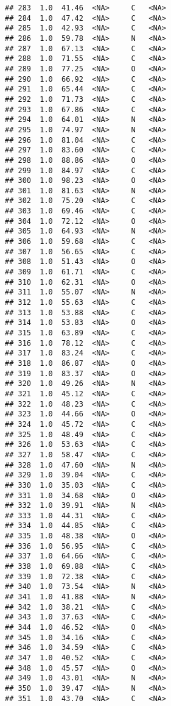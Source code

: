 \documentclass[
]{article}
\begin{document}
\begin{verbatim}
## 283  1.0  41.46  <NA>     C   <NA>
## 284  1.0  47.42  <NA>     C   <NA>
## 285  1.0  42.93  <NA>     C   <NA>
## 286  1.0  59.78  <NA>     N   <NA>
## 287  1.0  67.13  <NA>     C   <NA>
## 288  1.0  71.55  <NA>     C   <NA>
## 289  1.0  77.25  <NA>     O   <NA>
## 290  1.0  66.92  <NA>     C   <NA>
## 291  1.0  65.44  <NA>     C   <NA>
## 292  1.0  71.73  <NA>     C   <NA>
## 293  1.0  67.86  <NA>     C   <NA>
## 294  1.0  64.01  <NA>     N   <NA>
## 295  1.0  74.97  <NA>     N   <NA>
## 296  1.0  81.04  <NA>     C   <NA>
## 297  1.0  83.60  <NA>     C   <NA>
## 298  1.0  88.86  <NA>     O   <NA>
## 299  1.0  84.97  <NA>     C   <NA>
## 300  1.0  98.23  <NA>     O   <NA>
## 301  1.0  81.63  <NA>     N   <NA>
## 302  1.0  75.20  <NA>     C   <NA>
## 303  1.0  69.46  <NA>     C   <NA>
## 304  1.0  72.12  <NA>     O   <NA>
## 305  1.0  64.93  <NA>     N   <NA>
## 306  1.0  59.68  <NA>     C   <NA>
## 307  1.0  56.65  <NA>     C   <NA>
## 308  1.0  51.43  <NA>     O   <NA>
## 309  1.0  61.71  <NA>     C   <NA>
## 310  1.0  62.31  <NA>     O   <NA>
## 311  1.0  55.07  <NA>     N   <NA>
## 312  1.0  55.63  <NA>     C   <NA>
## 313  1.0  53.88  <NA>     C   <NA>
## 314  1.0  53.83  <NA>     O   <NA>
## 315  1.0  63.89  <NA>     C   <NA>
## 316  1.0  78.12  <NA>     C   <NA>
## 317  1.0  83.24  <NA>     C   <NA>
## 318  1.0  86.87  <NA>     O   <NA>
## 319  1.0  83.37  <NA>     O   <NA>
## 320  1.0  49.26  <NA>     N   <NA>
## 321  1.0  45.12  <NA>     C   <NA>
## 322  1.0  48.23  <NA>     C   <NA>
## 323  1.0  44.66  <NA>     O   <NA>
## 324  1.0  45.72  <NA>     C   <NA>
## 325  1.0  48.49  <NA>     C   <NA>
## 326  1.0  53.63  <NA>     C   <NA>
## 327  1.0  58.47  <NA>     C   <NA>
## 328  1.0  47.60  <NA>     N   <NA>
## 329  1.0  39.04  <NA>     C   <NA>
## 330  1.0  35.03  <NA>     C   <NA>
## 331  1.0  34.68  <NA>     O   <NA>
## 332  1.0  39.91  <NA>     N   <NA>
## 333  1.0  44.31  <NA>     C   <NA>
## 334  1.0  44.85  <NA>     C   <NA>
## 335  1.0  48.38  <NA>     O   <NA>
## 336  1.0  56.95  <NA>     C   <NA>
## 337  1.0  64.66  <NA>     C   <NA>
## 338  1.0  69.88  <NA>     C   <NA>
## 339  1.0  72.38  <NA>     C   <NA>
## 340  1.0  73.54  <NA>     N   <NA>
## 341  1.0  41.88  <NA>     N   <NA>
## 342  1.0  38.21  <NA>     C   <NA>
## 343  1.0  37.63  <NA>     C   <NA>
## 344  1.0  46.52  <NA>     O   <NA>
## 345  1.0  34.16  <NA>     C   <NA>
## 346  1.0  34.59  <NA>     C   <NA>
## 347  1.0  40.52  <NA>     C   <NA>
## 348  1.0  45.57  <NA>     O   <NA>
## 349  1.0  43.01  <NA>     N   <NA>
## 350  1.0  39.47  <NA>     N   <NA>
## 351  1.0  43.70  <NA>     C   <NA>

\end{verbatim}
\end{document}
